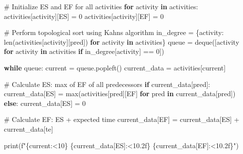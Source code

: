 \documentclass[
  letterpaper,
  DIV=11,
  numbers=noendperiod]{scrreprt}
\newenvironment{Shaded}{\begin{snugshade}}{\end{snugshade}}
\newcommand{\BuiltInTok}[1]{\textcolor[rgb]{0.00,0.23,0.31}{#1}}
\newcommand{\CommentTok}[1]{\textcolor[rgb]{0.37,0.37,0.37}{#1}}
\newcommand{\ControlFlowTok}[1]{\textcolor[rgb]{0.00,0.23,0.31}{\textbf{#1}}}
\newcommand{\DecValTok}[1]{\textcolor[rgb]{0.68,0.00,0.00}{#1}}
\newcommand{\KeywordTok}[1]{\textcolor[rgb]{0.00,0.23,0.31}{\textbf{#1}}}
\newcommand{\NormalTok}[1]{\textcolor[rgb]{0.00,0.23,0.31}{#1}}
\newcommand{\OperatorTok}[1]{\textcolor[rgb]{0.37,0.37,0.37}{#1}}
\newcommand{\SpecialCharTok}[1]{\textcolor[rgb]{0.37,0.37,0.37}{#1}}
\newcommand{\SpecialStringTok}[1]{\textcolor[rgb]{0.13,0.47,0.30}{#1}}
\newcommand{\StringTok}[1]{\textcolor[rgb]{0.13,0.47,0.30}{#1}}
\begin{document}
\begin{Shaded}
\begin{Highlighting}[]
    \CommentTok{\# Initialize ES and EF for all activities}
    \ControlFlowTok{for}\NormalTok{ activity }\KeywordTok{in}\NormalTok{ activities:}
\NormalTok{        activities[activity][}\StringTok{\textquotesingle{}ES\textquotesingle{}}\NormalTok{] }\OperatorTok{=} \DecValTok{0}
\NormalTok{        activities[activity][}\StringTok{\textquotesingle{}EF\textquotesingle{}}\NormalTok{] }\OperatorTok{=} \DecValTok{0}
    
    \CommentTok{\# Perform topological sort using Kahn\textquotesingle{}s algorithm}
\NormalTok{    in\_degree }\OperatorTok{=}\NormalTok{ \{activity: }\BuiltInTok{len}\NormalTok{(activities[activity][}\StringTok{\textquotesingle{}pred\textquotesingle{}}\NormalTok{]) }\ControlFlowTok{for}\NormalTok{ activity }\KeywordTok{in}\NormalTok{ activities\}}
\NormalTok{    queue }\OperatorTok{=}\NormalTok{ deque([activity }\ControlFlowTok{for}\NormalTok{ activity }\KeywordTok{in}\NormalTok{ activities }\ControlFlowTok{if}\NormalTok{ in\_degree[activity] }\OperatorTok{==} \DecValTok{0}\NormalTok{])}
    
    \ControlFlowTok{while}\NormalTok{ queue:}
\NormalTok{        current }\OperatorTok{=}\NormalTok{ queue.popleft()}
\NormalTok{        current\_data }\OperatorTok{=}\NormalTok{ activities[current]}
        
        \CommentTok{\# Calculate ES: max of EF of all predecessors}
        \ControlFlowTok{if}\NormalTok{ current\_data[}\StringTok{\textquotesingle{}pred\textquotesingle{}}\NormalTok{]:}
\NormalTok{            current\_data[}\StringTok{\textquotesingle{}ES\textquotesingle{}}\NormalTok{] }\OperatorTok{=} \BuiltInTok{max}\NormalTok{(activities[pred][}\StringTok{\textquotesingle{}EF\textquotesingle{}}\NormalTok{] }\ControlFlowTok{for}\NormalTok{ pred }\KeywordTok{in}\NormalTok{ current\_data[}\StringTok{\textquotesingle{}pred\textquotesingle{}}\NormalTok{])}
        \ControlFlowTok{else}\NormalTok{:}
\NormalTok{            current\_data[}\StringTok{\textquotesingle{}ES\textquotesingle{}}\NormalTok{] }\OperatorTok{=} \DecValTok{0}
        
        \CommentTok{\# Calculate EF: ES + expected time}
\NormalTok{        current\_data[}\StringTok{\textquotesingle{}EF\textquotesingle{}}\NormalTok{] }\OperatorTok{=}\NormalTok{ current\_data[}\StringTok{\textquotesingle{}ES\textquotesingle{}}\NormalTok{] }\OperatorTok{+}\NormalTok{ current\_data[}\StringTok{\textquotesingle{}te\textquotesingle{}}\NormalTok{]}
        
        \BuiltInTok{print}\NormalTok{(}\SpecialStringTok{f"}\SpecialCharTok{\{}\NormalTok{current}\SpecialCharTok{:\textless{}10\}}\SpecialStringTok{ }\SpecialCharTok{\{}\NormalTok{current\_data[}\StringTok{\textquotesingle{}ES\textquotesingle{}}\NormalTok{]}\SpecialCharTok{:\textless{}10.2f\}}\SpecialStringTok{ }\SpecialCharTok{\{}\NormalTok{current\_data[}\StringTok{\textquotesingle{}EF\textquotesingle{}}\NormalTok{]}\SpecialCharTok{:\textless{}10.2f\}}\SpecialStringTok{"}\NormalTok{)}
        

\end{Highlighting}
\end{Shaded}
\end{document}
